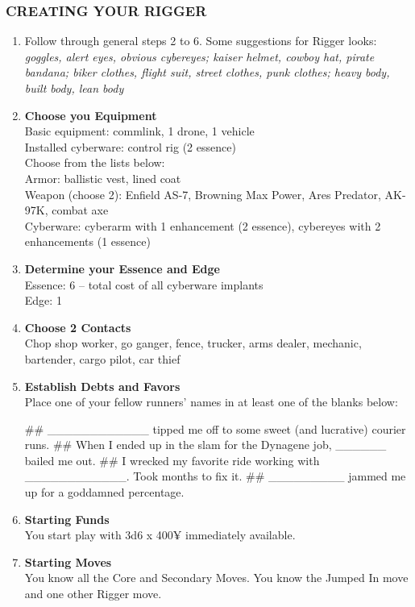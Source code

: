 \subsubsection{CREATING YOUR RIGGER}
\begin{enumerate}
    \item Follow through general steps 2 to 6. Some suggestions for Rigger looks: \textit{goggles, alert eyes, obvious cybereyes; kaiser helmet, cowboy hat, pirate bandana; biker clothes, flight suit, street clothes, punk clothes; heavy body, built body, lean body}
    
    \item \textbf{Choose you Equipment} \\
    Basic equipment: commlink, 1 drone, 1 vehicle \\
    Installed cyberware: control rig (2 essence) \\
    Choose from the lists below: \\
        Armor: ballistic vest, lined coat \\
        Weapon (choose 2): Enfield AS-7, Browning Max Power, Ares Predator, AK-97K, combat axe \\
        Cyberware: cyberarm with 1 enhancement (2 essence), cybereyes with 2 enhancements (1 essence)
    
    \item \textbf{Determine your Essence and Edge} \\
    Essence: 6 – total cost of all cyberware implants \\
    Edge: 1
    
    \item \textbf{Choose 2 Contacts} \\
    Chop shop worker, go ganger, fence, trucker, arms dealer, mechanic, bartender, cargo pilot, car thief
    
    \item \textbf{Establish Debts and Favors} \\
    Place one of your fellow runners’ names in at least one of the blanks below:
        \begin{easylist}
            ## \_\_\_\_\_\_\_\_\_\_\_\_ tipped me off to some sweet (and lucrative) courier runs.
            ## When I ended up in the slam for the Dynagene job, \_\_\_\_\_\_ bailed me out.
            ## I wrecked my favorite ride working with \_\_\_\_\_\_\_\_\_\_\_\_. Took months to fix it.
            ## \_\_\_\_\_\_\_\_\_ jammed me up for a goddamned percentage.
        \end{easylist}
    
    \item \textbf{Starting Funds} \\
    You start play with 3d6 x 400¥ immediately available.
    
    \item \textbf{Starting Moves} \\
    You know all the Core and Secondary Moves. You know the Jumped In move and one other Rigger move.
\end{enumerate}

